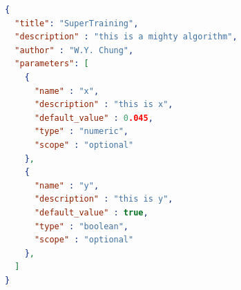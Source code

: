 \begin{lstlisting}[language=json]
{
  "title": "SuperTraining",
  "description" : "this is a mighty algorithm",
  "author" : "W.Y. Chung",
  "parameters": [
    {
      "name" : "x",
      "description" : "this is x",
      "default_value" : 0.045,
      "type" : "numeric",
      "scope" : "optional"
    },
    {
      "name" : "y",
      "description" : "this is y",
      "default_value" : true,
      "type" : "boolean",
      "scope" : "optional"
    },
  ]
} 
\end{lstlisting}

